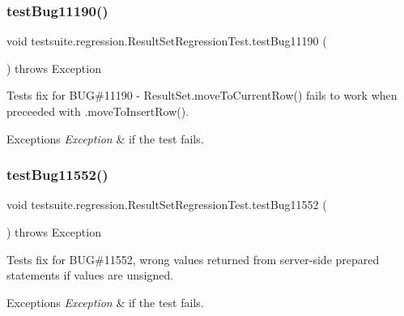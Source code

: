 \subsubsection{\texorpdfstring{test\+Bug11190()}{testBug11190()}}
{\footnotesize\ttfamily void testsuite.\+regression.\+Result\+Set\+Regression\+Test.\+test\+Bug11190 (\begin{DoxyParamCaption}{ }\end{DoxyParamCaption}) throws Exception}

Tests fix for B\+UG\#11190 -\/ Result\+Set.\+move\+To\+Current\+Row() fails to work when preceeded with .move\+To\+Insert\+Row().


\begin{DoxyExceptions}{Exceptions}
{\em Exception} & if the test fails. \\
\hline
\end{DoxyExceptions}
\mbox{\label{classtestsuite_1_1regression_1_1_result_set_regression_test_a51f2936ac4b4712e95e6a70490704482}} 
\subsubsection{\texorpdfstring{test\+Bug11552()}{testBug11552()}}
{\footnotesize\ttfamily void testsuite.\+regression.\+Result\+Set\+Regression\+Test.\+test\+Bug11552 (\begin{DoxyParamCaption}{ }\end{DoxyParamCaption}) throws Exception}

Tests fix for B\+UG\#11552, wrong values returned from server-\/side prepared statements if values are unsigned.


\begin{DoxyExceptions}{Exceptions}
{\em Exception} & if the test fails. \\
\hline
\end{DoxyExceptions}
\mbox{\label{classtestsuite_1_1regression_1_1_result_set_regression_test_a5967a08c14eff5f2158876c10b97da26}} 
